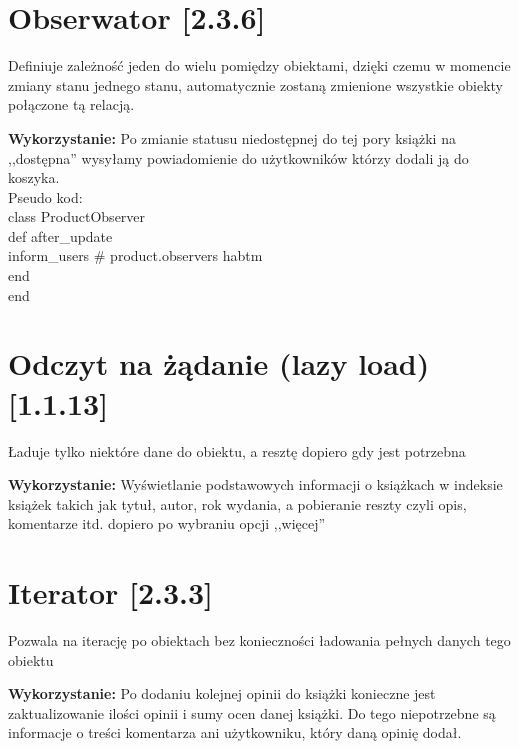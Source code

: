 \documentclass[pdflatex,11pt]{aghdpl}
\begin{document}


\section{Obserwator [2.3.6]}

Definiuje zależność jeden do wielu pomiędzy obiektami, dzięki czemu w momencie zmiany stanu jednego stanu, automatycznie zostaną zmienione wszystkie obiekty połączone tą relacją.

\textbf{Wykorzystanie:} Po zmianie statusu niedostępnej do tej pory książki na ,,dostępna'' wysyłamy powiadomienie do użytkowników którzy dodali ją do koszyka.\\
    Pseudo kod:\\
    class ProductObserver\\
       def after\_update\\
          inform\_users \# product.observers habtm\\
       end\\
    end


\section{Odczyt na żądanie (lazy load) [1.1.13]}

Ładuje tylko niektóre dane do obiektu, a resztę dopiero gdy jest potrzebna

\textbf{Wykorzystanie:} Wyświetlanie podstawowych informacji o książkach w indeksie książek takich jak tytuł, autor, rok wydania, a pobieranie reszty czyli opis, komentarze itd. dopiero po wybraniu opcji ,,więcej''


\section{Iterator [2.3.3]}

Pozwala na iterację po obiektach bez konieczności ładowania pełnych danych tego obiektu

\textbf{Wykorzystanie:} Po dodaniu kolejnej opinii do książki konieczne jest zaktualizowanie ilości opinii i sumy ocen danej książki. Do tego niepotrzebne są informacje o treści komentarza ani użytkowniku, który daną opinię dodał.

\end{document}
